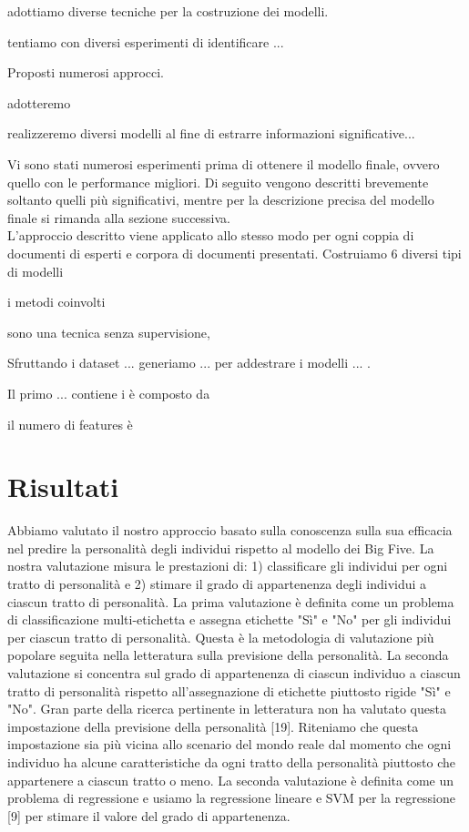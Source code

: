 adottiamo diverse tecniche per la costruzione dei modelli.  

tentiamo con diversi esperimenti di identificare ...

Proposti  numerosi  approcci. 

adotteremo

realizzeremo diversi modelli al fine di estrarre informazioni significative...







Vi sono stati numerosi esperimenti prima di ottenere il modello finale, ovvero quello con le performance migliori. Di seguito vengono descritti brevemente soltanto quelli più significativi, mentre per la descrizione precisa del modello finale si rimanda alla sezione successiva.\\





L'approccio descritto viene applicato allo stesso modo per ogni coppia di documenti di esperti e corpora di documenti presentati. Costruiamo 6 diversi tipi di modelli 


i metodi coinvolti 

sono una tecnica senza supervisione, 


Sfruttando i dataset ... generiamo ... per addestrare i modelli ... . 


Il primo ... contiene i
è composto da 


il numero di features è 

\section{Risultati}
\label{sec:risultati}

Abbiamo valutato il nostro approccio basato sulla conoscenza sulla sua efficacia nel predire la personalità degli individui rispetto al modello dei Big Five. La nostra valutazione misura le prestazioni di: 1) classificare gli individui per ogni tratto di personalità e 2) stimare il grado di appartenenza degli individui a ciascun tratto di personalità. La prima valutazione è definita come un problema di classificazione multi-etichetta e assegna etichette "Sì" e "No" per gli individui per ciascun tratto di personalità. Questa è la metodologia di valutazione più popolare seguita nella letteratura sulla previsione della personalità. La seconda valutazione si concentra sul grado di appartenenza di ciascun individuo a ciascun tratto di personalità rispetto all'assegnazione di etichette piuttosto rigide "Sì" e "No". Gran parte della ricerca pertinente in letteratura non ha valutato questa impostazione della previsione della personalità [19]. Riteniamo che questa impostazione sia più vicina allo scenario del mondo reale dal momento che ogni individuo ha alcune caratteristiche da ogni tratto della personalità piuttosto che appartenere a ciascun tratto o meno. La seconda valutazione è definita come un problema di regressione e usiamo la regressione lineare e SVM per la regressione [9] per stimare il valore del grado di appartenenza.

